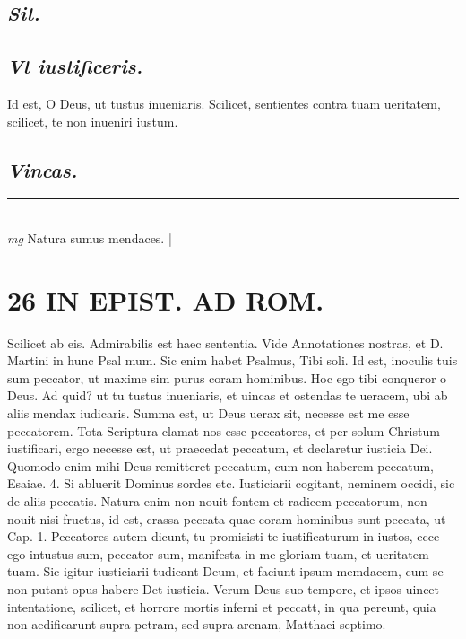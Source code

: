 \documentclass{article}
\begin{document}
\begin{pages}
\subsection*{\textit{Sit. }}
{}
\subsection*{\textit{Vt iustificeris. }}\pstart Id est, O Deus, ut tustus inueniaris.  \pend\pstart Scilicet, sentientes contra tuam ueritatem, scilicet, te non inueniri iustum.  \pend
{}
{}
\subsection*{\textit{Vincas. }}
\vspace{0.5cm}\noindent
\vspace{0.2cm}\rule{1cm}{0.2pt}\\ 
\hspace{0.2cm}\textit{mg}
\footnotesize Natura sumus mendaces.  
\normalsize| 
\section*{26 IN EPIST. AD ROM.  }
\marginpar{[ p.]}\pstart Scilicet ab eis. Admirabilis est haec sententia. Vide Annotationes nostras, et D. Martini in hunc Psal mum. Sic enim habet Psalmus, Tibi soli. Id est, inoculis tuis sum peccator, ut maxime sim purus coram hominibus. Hoc ego tibi conqueror o Deus. Ad quid? ut tu tustus inueniaris, et uincas et ostendas te ueracem, ubi ab aliis mendax iudicaris. Summa est, ut Deus uerax sit, necesse est me esse peccatorem. Tota Scriptura clamat nos esse peccatores, et per solum Christum iustificari, ergo necesse est, ut praecedat peccatum, et declaretur iusticia Dei. Quomodo enim mihi Deus remitteret peccatum, cum non haberem peccatum, Esaiae. 4. Si abluerit Dominus sordes etc.  Iusticiarii cogitant, neminem occidi, sic de aliis peccatis. Natura enim non nouit fontem et radicem peccatorum, non nouit nisi fructus, id est, crassa peccata quae coram hominibus sunt peccata, ut Cap. 1. Peccatores autem dicunt, tu promisisti te iustificaturum in iustos, ecce ego intustus sum, peccator sum, manifesta in me gloriam tuam, et ueritatem tuam. Sic igitur iusticiarii tudicant Deum, et faciunt ipsum memdacem, cum se non putant opus habere Det iusticia. Verum Deus suo tempore, et ipsos uincet intentatione, scilicet, et horrore mortis inferni et peccatt, in qua pereunt, quia non aedificarunt supra petram, sed supra arenam, Matthaei septimo.      \pend
{}
{}

\end{pages}
\end{document}

